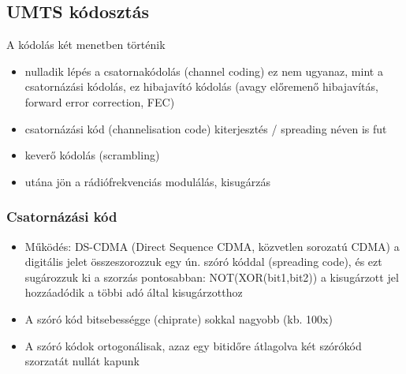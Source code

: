 \documentclass[10pt,a4paper]{article}
\begin{document}
\subsection{UMTS kódosztás}
A kódolás két menetben történik
\begin{itemize}
	\item nulladik lépés a csatornakódolás (channel coding) ez nem ugyanaz, mint a csatornázási kódolás, ez hibajavító kódolás (avagy előremenő hibajavítás, forward
	error correction, FEC)
	\item csatornázási kód (channelisation code) kiterjesztés / spreading néven is fut
	\item keverő kódolás (scrambling)
	\item utána jön a rádiófrekvenciás modulálás, kisugárzás
\end{itemize}
\subsubsection{Csatornázási kód}
\begin{itemize}
	\item Működés: DS-CDMA (Direct Sequence CDMA, közvetlen sorozatú
	CDMA)
	\subitem a digitális jelet összeszorozzuk egy ún. szóró kóddal (spreading
	code), és ezt sugározzuk ki
	\subitem a szorzás pontosabban: NOT(XOR(bit1,bit2))
	\subitem a kisugárzott jel hozzáadódik a többi adó által kisugárzotthoz
	\item A szóró kód bitsebességge (chiprate) sokkal nagyobb (kb. 100x)
	\item A szóró kódok ortogonálisak, azaz egy bitidőre átlagolva két
	szórókód szorzatát nullát kapunk
\end{itemize}
\end{document}

